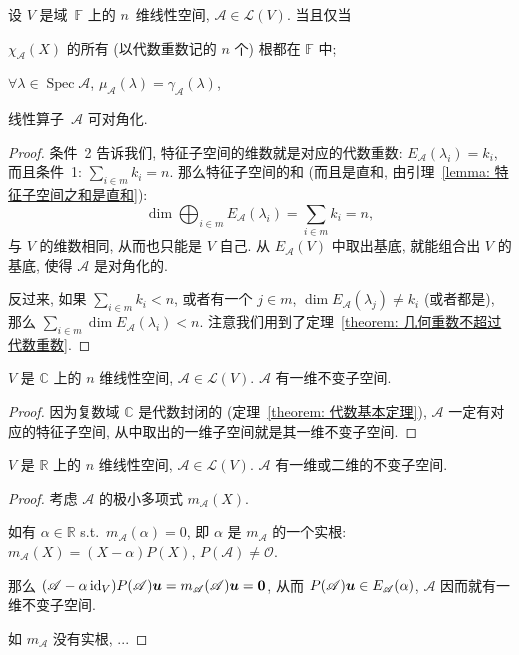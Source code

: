 \documentclass[openany, a5paper, oneside]{ctexbook}
\DeclareMathOperator{\Spec}{Spec}
\begin{document}
\begin{theorem}
	设 $V$ 是域~$\mathbb F$ 上的 $n$~维线性空间, $\mathscr A \in \mathcal L(V)$.
	当且仅当 \begin{enumerate*}
		\item $\chi_\mathscr A(X)$ 的所有 (以代数重数记的 $n$ 个) 根都在 $\mathbb F$ 中;
		\item $\forall \lambda \in \Spec \mathscr A$, $\mu_\mathscr A(\lambda) = \gamma_\mathscr A(\lambda)$,
	\end{enumerate*}
	线性算子~$\mathscr A$ 可对角化.
\end{theorem}
\begin{proof}
	条件~2 告诉我们, 特征子空间的维数就是对应的代数重数: $E_\mathscr A(\lambda_i) = k_i$, 而且条件~1: $\sum_{i \in m} k_i = n$.
	那么特征子空间的和 (而且是直和, 由引理~\ref{lemma: 特征子空间之和是直和}):
	\begin{equation*}
		\dim \bigoplus_{i \in m} E_\mathscr A(\lambda_i) = \sum_{i \in m}k_i = n,
	\end{equation*}
	与 $V$ 的维数相同, 从而也只能是 $V$ 自己. 
	从 $E_\mathscr A(V)$ 中取出基底, 就能组合出 $V$ 的基底, 使得 $\mathscr A$ 是对角化的.

	反过来, 如果 $\sum_{i \in m} k_i < n$, 或者有一个 $j \in m$, $\dim E_\mathscr A(\lambda_j) \neq k_i$ (或者都是), 那么 $\sum_{i \in m} \dim E_\mathscr A(\lambda_i) < n$. 
	注意我们用到了定理~\ref{theorem: 几何重数不超过代数重数}.
\end{proof}

\begin{theorem}[复线性算子有一维不变子空间]
	$V$ 是 $\mathbb C$ 上的 $n$ 维线性空间, $\mathscr A \in \mathcal L(V)$. 
	$\mathscr A$ 有一维不变子空间.
\end{theorem}
\begin{proof}
	因为复数域 $\mathbb C$ 是代数封闭的 (定理~\ref{theorem: 代数基本定理}), $\mathscr A$ 一定有对应的特征子空间, 从中取出的一维子空间就是其一维不变子空间.
\end{proof}

\begin{theorem}[实线性算子有一维或二维不变子空间]
	$V$ 是 $\mathbb R$ 上的 $n$ 维线性空间, $\mathscr A \in \mathcal L(V)$. 
	$\mathscr A$ 有一维或二维的不变子空间.
\end{theorem}
\begin{proof}
	考虑 $\mathscr A$ 的极小多项式 $m_\mathscr A(X)$.

	如有 $\alpha \in \mathbb R$ s.t.\ $m_\mathscr A(\alpha) = 0$, 即 $\alpha$ 是 $m_\mathscr A$ 的一个实根: $m_\mathscr A(X) = (X - \alpha) P(X)$, $P(\mathscr A) \neq \mathscr O$.

	那么 $(\mathscr A - \alpha \operatorname{id}_V) P(\mathscr A) \boldsymbol{u} = m_\mathscr A(\mathscr A) \boldsymbol{u} = \boldsymbol{0}$, 从而 $P(\mathscr A) \boldsymbol{u} \in E_\mathscr A(\alpha)$, $\mathscr A$ 因而就有一维不变子空间.

	如 $m_\mathscr A$ 没有实根, ...%
\end{proof}
\end{document}
